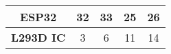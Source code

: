 \begin{tabular}[12pt]{ |c| c| c| c| c|}
    \hline
    \textbf{ESP32} & 32 & 33 & 25 & 26 \\ 
    \hline
    \textbf{L293D IC} & 3 & 6 & 11 & 14 \\ 
    \hline
    \end{tabular}

